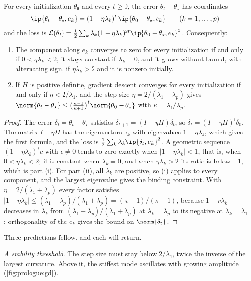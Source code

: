 \begin{refsection}
\begin{theorem*}
For every initialization $\theta_0$ and every $t\ge0$, the error $\theta_t-\theta_\star$ has coordinates
\[
  \ip{\theta_t-\theta_\star,e_k}=(1-\eta\lambda_k)^t\,\ip{\theta_0-\theta_\star,e_k}\qquad(k=1,\dots,p),
\]
and the loss is $\Loss(\theta_t)=\frac12\sum_k\lambda_k(1-\eta\lambda_k)^{2t}\ip{\theta_0-\theta_\star,e_k}^2$. Consequently:
\begin{enumerate}
\item The component along $e_k$ converges to zero for every initialization if and only if $0<\eta\lambda_k<2$; it stays constant if $\lambda_k=0$, and it grows without bound, with alternating sign, if $\eta\lambda_k>2$ and it is nonzero initially.
\item If $H$ is positive definite, gradient descent converges for every initialization if and only if $\eta<2/\lambda_1$, and the step size $\eta=2/(\lambda_1+\lambda_p)$ gives $\norm{\theta_t-\theta_\star}\le\big(\frac{\kappa-1}{\kappa+1}\big)^t\norm{\theta_0-\theta_\star}$ with $\kappa=\lambda_1/\lambda_p$.
\end{enumerate}
\end{theorem*}

\begin{proof}
The error $\delta_t=\theta_t-\theta_\star$ satisfies $\delta_{t+1}=(I-\eta H)\delta_t$, so $\delta_t=(I-\eta H)^t\delta_0$. The matrix $I-\eta H$ has the eigenvectors $e_k$ with eigenvalues $1-\eta\lambda_k$, which gives the first formula, and the loss is $\frac12\sum_k\lambda_k\ip{\delta_t,e_k}^2$. A geometric sequence $(1-\eta\lambda_k)^tc$ with $c\ne0$ tends to zero exactly when $|1-\eta\lambda_k|<1$, that is, when $0<\eta\lambda_k<2$; it is constant when $\lambda_k=0$, and when $\eta\lambda_k>2$ its ratio is below $-1$, which is part (i). For part (ii), all $\lambda_k$ are positive, so (i) applies to every component, and the largest eigenvalue gives the binding constraint. With $\eta=2/(\lambda_1+\lambda_p)$ every factor satisfies $|1-\eta\lambda_k|\le(\lambda_1-\lambda_p)/(\lambda_1+\lambda_p)=(\kappa-1)/(\kappa+1)$, because $1-\eta\lambda_k$ decreases in $\lambda_k$ from $(\lambda_1-\lambda_p)/(\lambda_1+\lambda_p)$ at $\lambda_k=\lambda_p$ to its negative at $\lambda_k=\lambda_1$; orthogonality of the $e_k$ gives the bound on $\norm{\delta_t}$.
\end{proof}

Three predictions follow, and each will return.

\emph{A stability threshold.} The step size must stay below $2/\lambda_1$, twice the inverse of the largest curvature. Above it, the stiffest mode oscillates with growing amplitude (\cref{fig:prologue:gd}).


\end{refsection}
